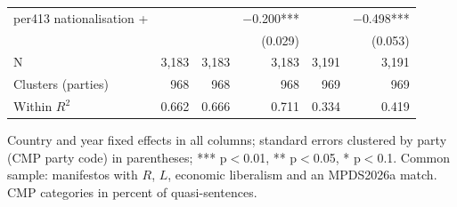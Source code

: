 \begin{table}[ht]
{\begin{tabular}{lrrrrr}
per413 nationalisation + &  &  & $-$0.200*** &  & $-$0.498*** \\
 &  &  & (0.029) &  & (0.053) \\
\midrule
N & 3,183 & 3,183 & 3,183 & 3,191 & 3,191 \\
Clusters (parties) & 968 & 968 & 968 & 969 & 969 \\
Within $R^2$ & 0.662 & 0.666 & 0.711 & 0.334 & 0.419 \\
\bottomrule
\end{tabular}}
\par\smallskip
\begin{minipage}{\linewidth}\scriptsize Country and year fixed effects in all columns; standard errors clustered by party (CMP party code) in parentheses; *** p$<$0.01, ** p$<$0.05, * p$<$0.1. Common sample: manifestos with $R$, $L$, economic liberalism and an MPDS2026a match. CMP categories in percent of quasi-sentences.\end{minipage}
\end{table}
